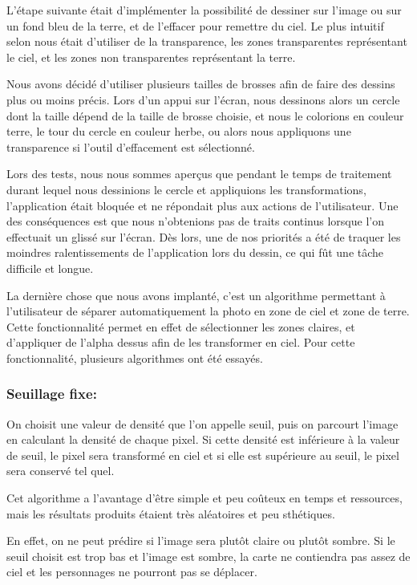 \documentclass{report}
\begin{document}
L'étape suivante était d'implémenter la possibilité de dessiner sur
l'image ou sur un fond bleu de la terre, et de l’effacer pour remettre
du ciel. Le plus intuitif selon nous était d'utiliser de la
transparence, les zones transparentes représentant le ciel, et les zones
non transparentes représentant la terre.

Nous avons décidé d'utiliser
plusieurs tailles de brosses afin de faire des dessins plus ou moins
précis. Lors d’un appui sur l’écran, nous dessinons alors un cercle
dont la taille dépend de la taille de brosse choisie, et nous le
colorions en couleur terre, le tour du cercle en couleur herbe, ou alors
nous appliquons une transparence si l’outil d’effacement est
sélectionné.
\bigskip

Lors des tests, nous nous sommes aperçus que pendant le temps de
traitement durant lequel nous dessinions le cercle et appliquions les
transformations, l’application était bloquée et ne répondait plus aux
actions de l’utilisateur. Une des conséquences est que nous n’obtenions
pas de traits continus lorsque l’on effectuait un glissé sur l’écran.
Dès lors, une de nos priorités a été de traquer les moindres
ralentissements de l’application lors du dessin, ce qui fût une tâche
difficile et longue.
\bigskip


La dernière chose que nous avons implanté, c’est un algorithme
permettant à l’utilisateur de séparer automatiquement la photo en zone
de ciel et zone de terre. Cette fonctionnalité permet en effet de
sélectionner les zones claires, et d’appliquer de l’alpha dessus afin de
les transformer en ciel. Pour cette fonctionnalité, plusieurs
algorithmes ont été essayés.

\subsubsection{Seuillage fixe:}

On choisit une valeur de densité que l’on appelle seuil, puis on
parcourt l’image en calculant la densité de chaque pixel. Si cette
densité est inférieure à la valeur de seuil, le pixel sera transformé
en ciel et si elle est supérieure au seuil, le pixel sera conservé tel
quel.
\bigskip

Cet algorithme a l’avantage d’être simple et peu coûteux en temps et
ressources, mais les résultats produits étaient très aléatoires et peu
sthétiques.

En effet, on ne peut prédire si l’image sera plutôt claire
ou plutôt sombre. Si le seuil choisit est trop bas et l’image est
sombre, la carte ne contiendra pas assez de ciel et les personnages ne
pourront pas se déplacer.
\end{document}
